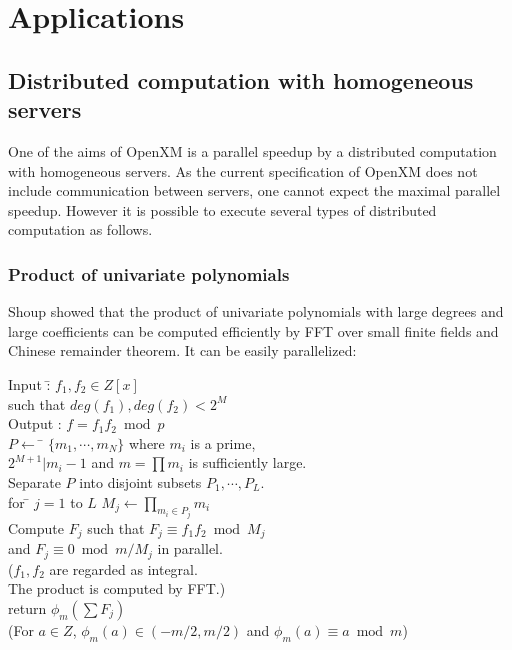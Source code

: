
\section{Applications}
\subsection{Distributed computation with homogeneous servers}
\label{section:homog}

One of the aims of OpenXM is a parallel speedup by a distributed computation
with homogeneous servers. As the current specification of OpenXM does
not include communication between servers, one cannot expect
the maximal parallel speedup. However it is possible to execute
several types of distributed computation as follows.

\subsubsection{Product of univariate polynomials}

Shoup \cite{Shoup} showed that the product of univariate polynomials
with large degrees and large coefficients can be computed efficiently
by FFT over small finite fields and Chinese remainder theorem.
It can be easily parallelized:

\begin{tabbing}
Input :\= $f_1, f_2 \in Z[x]$\\
\> such that $deg(f_1), deg(f_2) < 2^M$\\
Output : $f = f_1f_2 \bmod p$\\
$P \leftarrow$ \= $\{m_1,\cdots,m_N\}$ where $m_i$ is a prime, \\
\> $2^{M+1}|m_i-1$ and $m=\prod m_i $ is sufficiently large. \\
Separate $P$ into disjoint subsets $P_1, \cdots, P_L$.\\
for \= $j=1$ to $L$ $M_j \leftarrow \prod_{m_i\in P_j} m_i$\\
Compute $F_j$ such that $F_j \equiv f_1f_2 \bmod M_j$\\
\> and $F_j \equiv 0 \bmod m/M_j$ in parallel.\\
\> ($f_1, f_2$ are regarded as integral.\\
\> The product is computed by FFT.)\\
return $\phi_m(\sum F_j)$\\
(For $a \in Z$, $\phi_m(a) \in (-m/2,m/2)$ and $\phi_m(a)\equiv a \bmod m$)
\end{tabbing}

